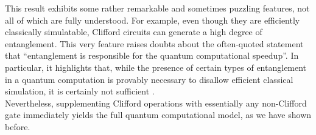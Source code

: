 This result exhibits some rather remarkable and sometimes puzzling features, not all of which are fully understood. For example, even though they are efficiently classically simulatable, Clifford circuits can generate a high degree of entanglement. This very feature raises doubts about the often-quoted statement that “entanglement is responsible for the quantum computational speedup”. In particular, it highlights that, while the presence of certain types of entanglement in a quantum computation is provably necessary to disallow efficient classical simulation, it is certainly not sufficient \cite{Nest2008Nov}. \\
Nevertheless, supplementing Clifford operations with essentially any non-Clifford gate immediately yields the full quantum computational model, as we have shown before.

